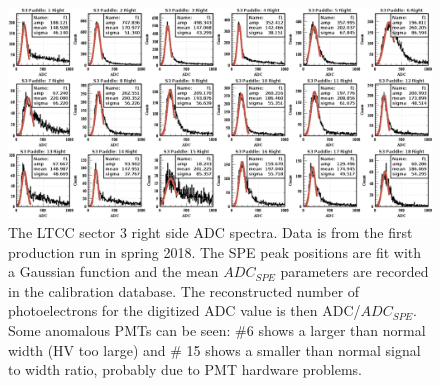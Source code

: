 \begin{figure}
	\centering
	\includegraphics[width=2.1\columnwidth,keepaspectratio]{img/spe.png}
	\caption{The LTCC sector 3 right side ADC spectra. Data is from the first production run in spring 2018.
          The SPE peak positions are fit with a Gaussian function and the mean $ADC_{SPE}$ parameters are recorded
          in the calibration database. The reconstructed number of photoelectrons for the digitized ADC value is
          then ADC/$ADC_{SPE}$. Some anomalous PMTs can be seen: \#6 shows a larger than normal width (HV too large)
          and \# 15 shows a smaller than normal signal to width ratio, probably due to PMT hardware problems.}
	\label{fig:speCalibration}
\end{figure}
